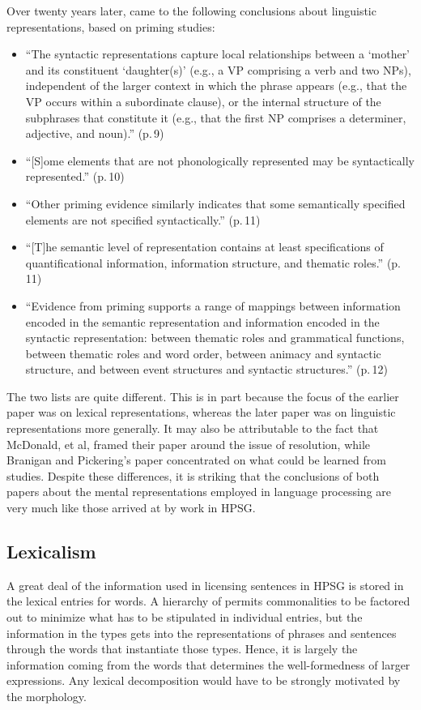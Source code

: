 \documentclass[a4paper]{article}
\begin{document}
Over twenty years later, \citet{BraniganPickering2017} came to the following conclusions about linguistic representations, based on priming studies:
\begin{itemize}
\item ``The syntactic representations capture local relationships
between a `mother' and its constituent `daughter(s)' (e.g.,
a VP comprising a verb and two NPs), independent of the
larger context in which the phrase appears (e.g., that the VP
occurs within a subordinate clause), or the internal structure
of the subphrases that constitute it (e.g., that the
first NP comprises a determiner, adjective, and noun).'' (p.\,9)
\item ``[S]ome elements that are not phonologically represented may
be syntactically represented.'' (p.\,10)
\item ``Other priming evidence similarly indicates that some
semantically specified elements are not specified syntactically.'' (p.\,11)
\item ``[T]he semantic level of representation
contains at least specifications of quantificational information,
information structure, and thematic roles.'' (p.\,11)
\item ``Evidence
from priming supports a range of mappings between information encoded in the semantic representation and information encoded in the syntactic representation: between
thematic roles and grammatical functions, between thematic roles and word order, between animacy and syntactic
structure, and between event structures and syntactic
structures.'' (p.\,12)
\end{itemize}
The two lists are quite different.  This is in part because the focus of the earlier paper was on lexical representations, whereas the later paper was on linguistic representations more generally.  It may also be attributable to the fact that McDonald, et al, framed their paper around the issue of  resolution, while Branigan and Pickering's paper concentrated on what could be learned from  studies.  Despite these differences, it is striking that the conclusions of both papers about the mental representations employed in language processing are very much like those arrived at by work in HPSG.

\subsection{Lexicalism}

A great deal of the information used in licensing sentences in HPSG is stored in the lexical entries for words.  A hierarchy of  permits commonalities to be factored out to minimize what has to be stipulated in individual entries, but the information in the types gets into the representations of phrases and sentences through the words that instantiate those types. Hence, it is largely the information coming from the words that determines the well-formedness of larger expressions.  Any lexical decomposition would have to be strongly motivated by the morphology.
\end{document}
